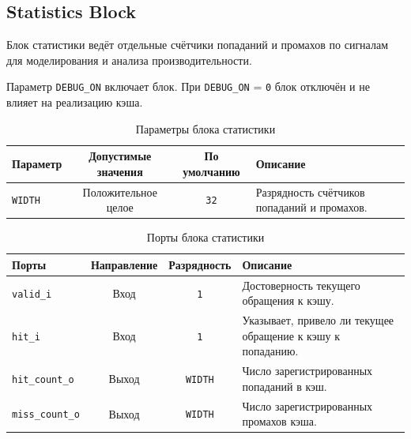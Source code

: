 
\subsection{Statistics Block}
\label{subsec:statistics_block}

Блок статистики ведёт отдельные счётчики попаданий и промахов по сигналам \Comparator для моделирования и анализа производительности.

Параметр \verb|DEBUG_ON| включает блок. При \verb|DEBUG_ON| = \verb|0| блок отключён и не влияет на реализацию кэша.

\begin{table}[H]
	\centering
	\small
	\begin{tabularx}{\textwidth}{l c c X}
		\toprule
		\textbf{Параметр} & \textbf{Допустимые значения} & \textbf{По умолчанию} & \textbf{Описание} \\
		\midrule
		
		\verb|WIDTH| &
		Положительное целое &
		\verb|32| &
		Разрядность счётчиков попаданий и промахов. \\
		
		\bottomrule
	\end{tabularx}
	\caption{Параметры блока статистики}
	\label{tab:statistics_block_parameters}
\end{table}

\begin{table}[H]
	\centering
	\label{tab:statistics_block_ports}
	\small
	\begin{tabularx}{\textwidth}{l c c X}
		\toprule
		\textbf{Порты} & \textbf{Направление} & \textbf{Разрядность} & \textbf{Описание} \\
		\midrule
		
		\verb|valid_i| &
		Вход &
		\verb|1| &
		Достоверность текущего обращения к кэшу. \\
		
		\verb|hit_i| &
		Вход &
		\verb|1| &
		Указывает, привело ли текущее обращение к кэшу к попаданию. \\
		
		\verb|hit_count_o| &
		Выход &
		\verb|WIDTH| &
		Число зарегистрированных попаданий в кэш. \\
		
		\verb|miss_count_o| &
		Выход &
		\verb|WIDTH| &
		Число зарегистрированных промахов кэша. \\
		
		\bottomrule
	\end{tabularx}
	\caption{Порты блока статистики}
\end{table}
